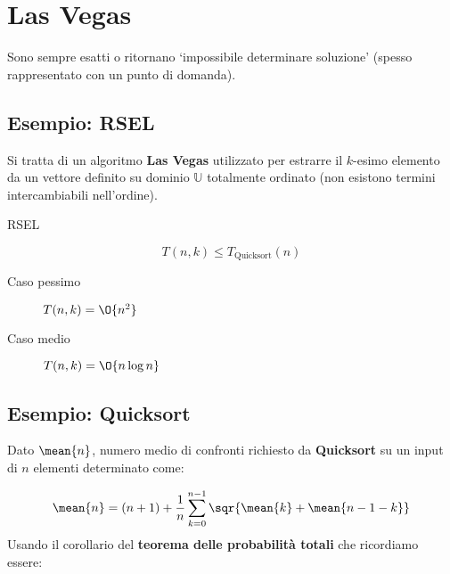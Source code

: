 \documentclass[\main/main.tex]{subfiles}
\begin{document}
\section{Las Vegas}
Sono sempre esatti o ritornano `impossibile determinare soluzione' (spesso rappresentato con un punto di domanda).

\subsection{Esempio: RSEL}
Si tratta di un algoritmo \textbf{Las Vegas} utilizzato per estrarre il \(k\)-esimo elemento da un vettore definito su dominio \(\mathbb{U}\) totalmente ordinato (non esistono termini intercambiabili nell'ordine).

\IncMargin{1em}
\begin{algorithm}
	\BlankLine
	\caption{RSEL}
\end{algorithm}\DecMargin{1em}

\[
	T(n,k) \leq T_{\text{Quicksort}}(n)
\]
\begin{description}
	\item[Caso pessimo] \(T(n,k) = \O{n^2}\)
	\item[Caso medio] \(T(n,k) = \O{n\log{n}}\)
\end{description}

\subsection{Esempio: Quicksort}
Dato \(\mean{n}\), numero medio di confronti richiesto da \textbf{Quicksort} su un input di \(n\) elementi determinato come:

\[
	\mean{n} = (n+1) + \frac{1}{n}\sum_{k=0}^{n-1} \sqr{\mean{k} + \mean{n-1-k}}
\]
Usando il corollario del \textbf{teorema delle probabilità totali} che ricordiamo essere:

\formulaProbTot{}
\end{document}
